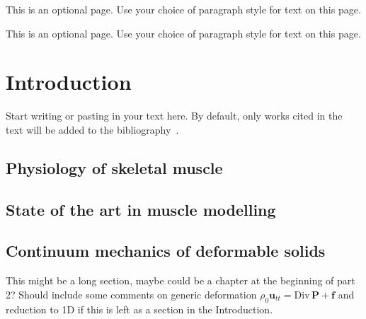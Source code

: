 \documentclass{sfuthesis}
\numberwithin{equation}{chapter}
\numberwithin{figure}{chapter}
\numberwithin{table}{chapter}
\theoremstyle{definition}
\def\*#1{{\mathbf{#1}}} %
\newcommand{\Divt}[1]{{\bm{\mathrm{Div}} \, #1}}
\begin{document}
\begin{dedication}
This is an optional page. Use your choice of paragraph style for text on this page.
\end{dedication}


\begin{acknowledgements}
This is an optional page. Use your choice of paragraph style for text on this page.
\end{acknowledgements}

%
\hypersetup{linkbordercolor=black,hidelinks}
\tableofcontents%
\clearpage

%
\listoftables%
\clearpage

%
\listoffigures%
\clearpage





%
%

\mainmatter%

\chapter{Introduction}

Start writing or pasting in your text here. By default, only works cited in the text will be added to the bibliography~\cite{HolzapfelBook}.

\section{Physiology of skeletal muscle}

\section{State of the art in muscle modelling}

\section{Continuum mechanics of deformable solids}

This might be a long section, maybe could be a chapter at the beginning of part 2? Should include some comments on generic deformation $\rho_0 \*u_{tt} = \Divt{\*P} + \*f$ and reduction to 1D if this is left as a section in the Introduction.
\end{document}
